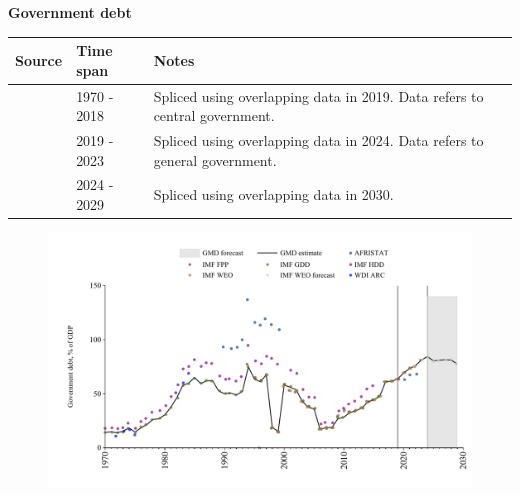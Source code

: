 \documentclass[12pt,a4paper,landscape]{article}
\begin{document}
\begin{adjustbox}{max totalsize={\paperwidth}{\paperheight},center}
\begin{minipage}[t][\textheight][t]{\textwidth}
\vspace*{0.5cm}
{}
\begin{center}
{\Large\bfseries Government debt}
\end{center}
\vspace{0.5cm}
\begin{table}[H]
\centering
\small
\begin{tabular}{|l|l|l|}
\hline
\textbf{Source} & \textbf{Time span} & \textbf{Notes} \\
\hline
\rowcolor{white}\cite{IMF_GDD}& 1970 - 2018 &Spliced using overlapping data in 2019. Data refers to central government.\\
\rowcolor{lightgray}\cite{IMF_FPP}& 2019 - 2023 &Spliced using overlapping data in 2024. Data refers to general government.\\
\rowcolor{white}\cite{IMF_WEO_forecast}& 2024 - 2029 &Spliced using overlapping data in 2030. \\
\hline
\end{tabular}
\end{table}
\begin{figure}[H]
\centering
\includegraphics[width=\textwidth,height=0.6\textheight,keepaspectratio]{graphs/SEN_govdebt_GDP.pdf}
\end{figure}
\end{minipage}
\end{adjustbox}
\end{document}

